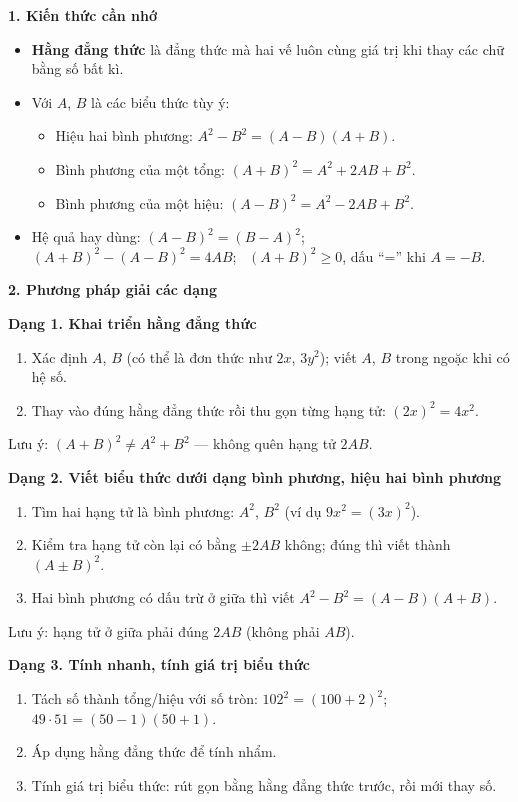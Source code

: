 \par{}\par\smallskip
\textbf{1. Kiến thức cần nhớ}
\begin{itemize}
\item \textbf{Hằng đẳng thức} là đẳng thức mà hai vế luôn cùng giá trị khi thay các chữ bằng số bất kì.
\item Với $A$, $B$ là các biểu thức tùy ý:
\begin{itemize}
\item Hiệu hai bình phương: $\boxed{A^2-B^2=(A-B)(A+B)}$.
\item Bình phương của một tổng: $\boxed{(A+B)^2=A^2+2AB+B^2}$.
\item Bình phương của một hiệu: $\boxed{(A-B)^2=A^2-2AB+B^2}$.
\end{itemize}
\item Hệ quả hay dùng: $(A-B)^2=(B-A)^2$; \ $(A+B)^2-(A-B)^2=4AB$; \ $(A+B)^2\ge 0$, dấu ``='' khi $A=-B$.
\end{itemize}

\textbf{2. Phương pháp giải các dạng}

\textbf{Dạng 1. Khai triển hằng đẳng thức}
\begin{enumerate}
\item Xác định $A$, $B$ (có thể là đơn thức như $2x$, $3y^2$); viết $A$, $B$ trong ngoặc khi có hệ số.
\item Thay vào đúng hằng đẳng thức rồi thu gọn từng hạng tử: $(2x)^2=4x^2$.
\end{enumerate}
Lưu ý: $(A+B)^2\ne A^2+B^2$ — không quên hạng tử $2AB$.

\textbf{Dạng 2. Viết biểu thức dưới dạng bình phương, hiệu hai bình phương}
\begin{enumerate}
\item Tìm hai hạng tử là bình phương: $A^2$, $B^2$ (ví dụ $9x^2=(3x)^2$).
\item Kiểm tra hạng tử còn lại có bằng $\pm 2AB$ không; đúng thì viết thành $(A\pm B)^2$.
\item Hai bình phương có dấu trừ ở giữa thì viết $A^2-B^2=(A-B)(A+B)$.
\end{enumerate}
Lưu ý: hạng tử ở giữa phải đúng $2AB$ (không phải $AB$).

\textbf{Dạng 3. Tính nhanh, tính giá trị biểu thức}
\begin{enumerate}
\item Tách số thành tổng/hiệu với số tròn: $102^2=(100+2)^2$; \ $49\cdot 51=(50-1)(50+1)$.
\item Áp dụng hằng đẳng thức để tính nhẩm.
\item Tính giá trị biểu thức: rút gọn bằng hằng đẳng thức trước, rồi mới thay số.
\end{enumerate}

